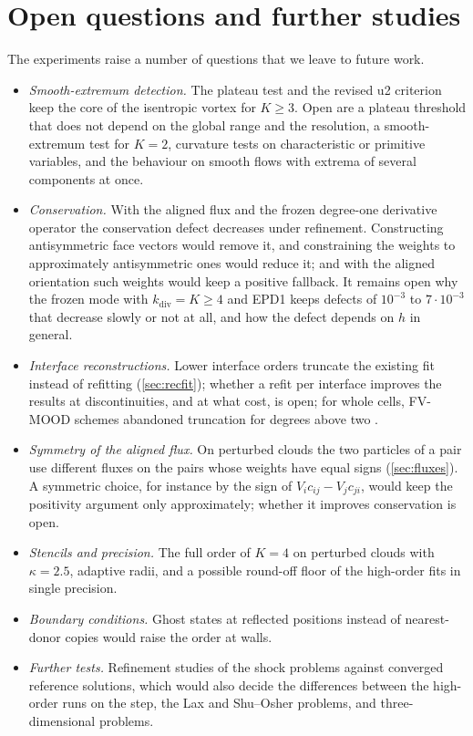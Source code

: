 \documentclass[11pt,a4paper]{article}
\numberwithin{equation}{section}
\begin{document}
\section{Open questions and further studies}\label{sec:open}

The experiments raise a number of questions that we leave to future work.
\begin{itemize}
\item \emph{Smooth-extremum detection.} The plateau test and the revised u2 criterion keep the core of the isentropic vortex for $K\ge3$. Open are a plateau threshold that does not depend on the global range and the resolution, a smooth-extremum test for $K=2$, curvature tests on characteristic or primitive variables, and the behaviour on smooth flows with extrema of several components at once.
\item \emph{Conservation.} With the aligned flux and the frozen degree-one derivative operator the conservation defect decreases under refinement. Constructing antisymmetric face vectors \cite{Chiu2012} would remove it, and constraining the weights to approximately antisymmetric ones \cite{Suchde2017} would reduce it; and with the aligned orientation such weights would keep a positive fallback. It remains open why the frozen mode with $k_{\mathrm{div}}=K\ge4$ and EPD1 keeps defects of $10^{-3}$ to $7\cdot10^{-3}$ that decrease slowly or not at all, and how the defect depends on $h$ in general.
\item \emph{Interface reconstructions.} Lower interface orders truncate the existing fit instead of refitting (\cref{sec:recfit}); whether a refit per interface improves the results at discontinuities, and at what cost, is open; for whole cells, FV-MOOD schemes abandoned truncation for degrees above two \cite[Remark~4]{Diot2012}.
\item \emph{Symmetry of the aligned flux.} On perturbed clouds the two particles of a pair use different fluxes on the pairs whose weights have equal signs (\cref{sec:fluxes}). A symmetric choice, for instance by the sign of $V_ic_{ij}-V_jc_{ji}$, would keep the positivity argument only approximately; whether it improves conservation is open.
\item \emph{Stencils and precision.} The full order of $K=4$ on perturbed clouds with $\kappa=2.5$, adaptive radii, and a possible round-off floor of the high-order fits in single precision.
\item \emph{Boundary conditions.} Ghost states at reflected positions instead of nearest-donor copies would raise the order at walls.
\item \emph{Further tests.} Refinement studies of the shock problems against converged reference solutions, which would also decide the differences between the high-order runs on the step, the Lax and Shu--Osher problems, and three-dimensional problems.
\end{itemize}
\end{document}
